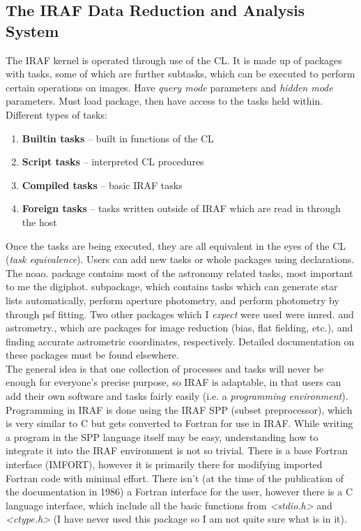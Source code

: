 \documentclass[a4paper]{article}
\begin{document}
\subsection{The IRAF Data Reduction and Analysis System}
The IRAF kernel is operated through use of the CL.  It is made up of packages with tasks, some of which are further subtasks, which can be executed to perform certain operations on images.  Have \textit{query mode} parameters and \textit{hidden mode} parameters.  Must load package, then have access to the tasks held within.  \\
Different types of tasks:
\begin{enumerate}
\item \textbf{Builtin tasks} -- built in functions of the CL
\item \textbf{Script tasks} -- interpreted CL procedures
\item \textbf{Compiled tasks} -- basic IRAF tasks
\item \textbf{Foreign tasks} -- tasks written outside of IRAF which are read in through the host
\end{enumerate}
Once the tasks are being executed, they are all equivalent in the eyes of the CL (\textit{task equivalence}).  Users can add new tasks or whole packages using declarations.  The noao. package contains most of the astronomy related tasks, most important to me the digiphot. subpackage, which contains tasks which can generate star lists automatically, perform aperture photometry, and perform photometry by through psf fitting.  Two other packages which I \textit{expect} were used were imred. and astrometry., which are packages for image reduction (bias, flat fielding, etc.), and finding accurate astrometric coordinates, respectively.  Detailed documentation on these packages must be found elsewhere.   \\ 
The general idea is that one collection of processes and tasks will never be enough for everyone's precise purpose, so IRAF is adaptable, in that users can add their own software and tasks fairly easily (i.e. a \textit{programming environment}).  \\ 
Programming in IRAF is done using the IRAF SPP (subset preprocessor), which is very similar to C but gets converted to Fortran for use in IRAF.  While writing a program in the SPP language itself may be easy, understanding how to integrate it into the IRAF environment is not so trivial.  There is a base Fortran interface (IMFORT), however it is primarily there for modifying imported Fortran code with minimal effort.  There isn't (at the time of the publication of the documentation in 1986) a Fortran interface for the user, however there is a C language interface, which include all the basic functions from \textit{<stdio.h>} and \textit{<ctype.h>} (I have never used this package so I am not quite sure what is in it).  \par 
\end{document}
